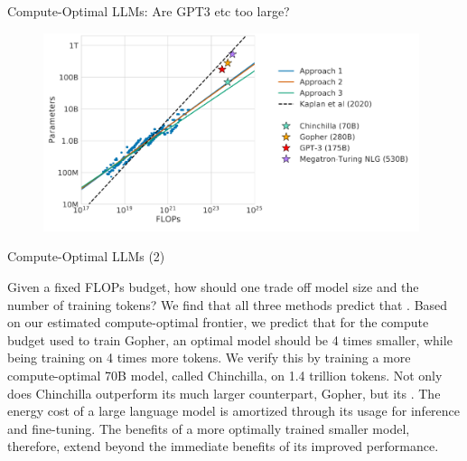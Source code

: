 \begin{vbframe}{Compute-Optimal LLM\MakeLowercase{s}: Are GPT3 etc too large?}

\vfill

\begin{figure}
	\centering
	\includegraphics[width = 11cm]{./figure/chinchilla.png} \\ 
\end{figure}

\vfill

\end{vbframe}


\begin{vbframe}{Compute-Optimal LLM\MakeLowercase{s} (2)}

Given a fixed FLOPs budget, how should one trade off model size and
the number of training tokens? We find that all three methods predict
that . Based on our estimated
compute-optimal frontier, we predict that for the compute budget used
to train Gopher, an optimal model should be 4 times smaller, while
being training on 4 times more tokens. We verify this by training a more
compute-optimal 70B model, called Chinchilla, on 1.4 trillion tokens.
Not only does Chinchilla outperform its much larger counterpart,
Gopher, but its . The
energy cost of a large language model is amortized through its usage
for inference and fine-tuning. The benefits of a more optimally trained
smaller model, therefore, extend beyond the immediate benefits of its
improved performance.

\end{vbframe}

